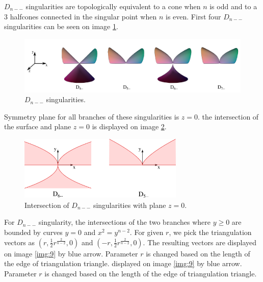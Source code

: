 $D_{n--}$ singularities are topologically equivalent to a cone when $n$ is
odd and to a 3 halfcones connected in the singular point when $n$ is even.
First four $D_{n--}$ singularities can be seen on image \ref{img:8}.

\begin{figure}
    \centerline{\includegraphics[width=1\textwidth]{images/img8}}
    \caption[$D_{n--}$ singularities]
    {$D_{n--}$ singularities. \cite{singsurf}}
    \label{img:8}
\end{figure}

Symmetry plane for all branches of these singularities is $z=0$.
the intersection of the surface and plane $z=0$ is displayed on image \ref{img:6}.

\begin{figure}
    \centerline{\includegraphics[width=0.7\textwidth]{images/img6}}
    \caption[Intersection of $D_{n--}$ singularities with plane $z=0$.]
    {Intersection of $D_{n--}$ singularities with plane $z=0$.}
    \label{img:6}
\end{figure}

For $D_{n--}$ singularity, the intersections of the two branches where
$y \geq 0$ are bounded by curves $y=0$ and $x^2=y^{n-2}$. For given $r$,
we pick the triangulation vectors as $(r, \frac{1}{2}r^{\frac{2}{n-2}}, 0)$
and $(-r, \frac{1}{2}r^{\frac{2}{n-2}}, 0)$. The resulting vectors are
displayed on image \ref{img:9} by blue arrow. Parameter $r$ is changed based
on the length of the edge of triangulation triangle.
displayed on image \ref{img:9} by blue arrow. Parameter $r$ is changed based
on the length of the edge of triangulation triangle.

